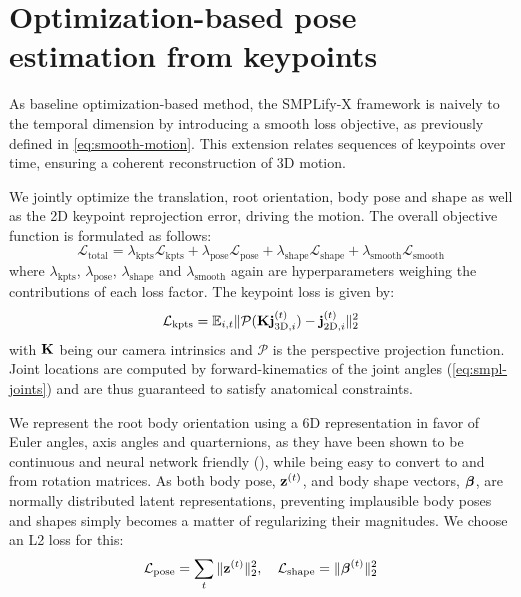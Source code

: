 \section{Optimization-based pose estimation from keypoints}
As baseline optimization-based method, the SMPLify-X framework is naively to the temporal dimension by introducing a smooth loss objective, as previously defined in \cref{eq:smooth-motion}. This extension relates sequences of keypoints over time, ensuring a coherent reconstruction of 3D motion. 

We jointly optimize the translation, root orientation, body pose and shape as well as the 2D keypoint reprojection error, driving the motion. The overall objective function is formulated as follows:
\begin{equation}
    \mathcal{L}_{\text{total}} = \lambda_{\text{kpts}} \mathcal{L}_{\text{kpts}} + \lambda_{\text{pose}} \mathcal{L}_{\text{pose}} + \lambda_{\text{shape}} \mathcal{L}_{\text{shape}} + \lambda_{\text{smooth}} \mathcal{L}_{\text{smooth}}
\end{equation}
where $\lambda_\text{kpts}$,  $\lambda_\text{pose}$,  $\lambda_\text{shape}$ and  $\lambda_\text{smooth}$ again are hyperparameters weighing the contributions of each loss factor. The keypoint loss is given by:
\begin{equation} \label{eq:kpts-error}
    \mathcal{L}_\text{kpts} = \mathbb{E}_{i,t} \| \mathcal{P}( \boldsymbol{\mathbf{K}} \boldsymbol{\mathbf{j}}_{\text{3D},i}^{(t)}) - \boldsymbol{\mathbf{j}}_{\text{2D},i}^{(t)} \|_2^2
\end{equation}
with $\boldsymbol{\mathbf{K}}$ being our camera intrinsics and $\mathcal{P}$ is the perspective projection function. Joint locations are computed by forward-kinematics of the joint angles (\cref{eq:smpl-joints}) and are thus guaranteed to satisfy anatomical constraints. 

We represent the root body orientation using a 6D representation in favor of Euler angles, axis angles and quarternions, as they have been shown to be continuous and neural network friendly (\cite{Zhou_2019_CVPR}), while being easy to convert to and from rotation matrices. As both body pose, $\boldsymbol{\mathbf{z}}^{(t)}$, and body shape vectors, $\boldsymbol{\mathbf{\beta}}$, are normally distributed latent representations, preventing implausible body poses and shapes simply becomes a matter of regularizing their magnitudes. We choose an L2 loss for this:
\begin{equation}
    \mathcal{L}_\text{pose} = \sum_t \| \boldsymbol{\mathbf{z}}^{(t)} \|_2^2, \quad \mathcal{L}_\text{shape} =  \| \boldsymbol{\mathbf{\beta}}^{(t)} \|_2^2 
\end{equation}



